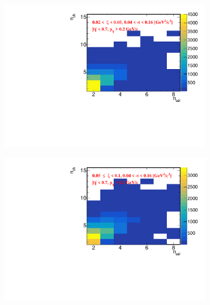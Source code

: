 \begin{figure}[h!]
	\centering
	\begin{subfigure}{.49\textwidth}
		\includegraphics[width=\textwidth,page=1]{chapters/chrgSTAR/img/unfolding/matrix_0.pdf}
	\end{subfigure}
	\begin{subfigure}{.49\textwidth}
		\includegraphics[width=\textwidth,page=1]{chapters/chrgSTAR/img/unfolding/matrix_1.pdf}
	\end{subfigure}
	\begin{subfigure}{.49\textwidth}

\end{subfigure}
\end{figure}
